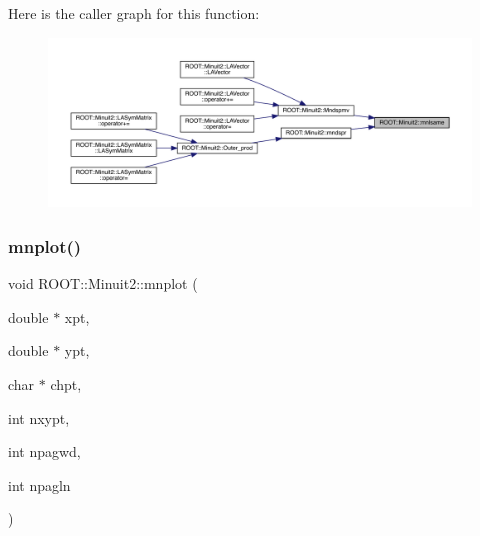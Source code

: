Here is the caller graph for this function\+:\nopagebreak
\begin{figure}[H]
\begin{center}
\leavevmode
\includegraphics[width=350pt]{d6/d3a/namespaceROOT_1_1Minuit2_a3f90b826c2c1b4313f9a90c22b8ee657_icgraph}
\end{center}
\end{figure}
\mbox{\label{namespaceROOT_1_1Minuit2_a2c786d8330736525f0757ba1848f5bc4}} 
\subsubsection{\texorpdfstring{mnplot()}{mnplot()}}
{\footnotesize\ttfamily void R\+O\+O\+T\+::\+Minuit2\+::mnplot (\begin{DoxyParamCaption}\item[{double $\ast$}]{xpt,  }\item[{double $\ast$}]{ypt,  }\item[{char $\ast$}]{chpt,  }\item[{int}]{nxypt,  }\item[{int}]{npagwd,  }\item[{int}]{npagln }\end{DoxyParamCaption})}

